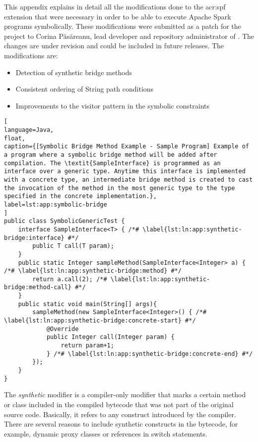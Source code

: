 \label{app:collaborations}

This appendix explains in detail all the modifications done to the \acrfull{acr:spf} extension that were necessary in order to be able to execute Apache Spark programs symbolically. These modifications were submitted as a patch for the \spf{} project to Corina Păsăreanu, lead developer and repository administrator of \spf{}. The changes are under revision and could be included in future releases. The modifications are:

\begin{itemize}
	\item Detection of synthetic bridge methods
	\item Consistent ordering of String path conditions
	\item Improvements to the visitor pattern in the symbolic constraints
\end{itemize}


\begin{lstlisting}[
language=Java,
float,
caption={[Symbolic Bridge Method Example - Sample Program] Example of a program where a symbolic bridge method will be added after compilation. The \textit{SampleInterface} is programmed as an interface over a generic type. Anytime this interface is implemented with a concrete type, an intermediate bridge method is created to cast the invocation of the method in the most generic type to the type specified in the concrete implementation.},
label=lst:app:symbolic-bridge
]
public class SymbolicGenericTest {
	interface SampleInterface<T> { /*# \label{lst:ln:app:synthetic-bridge:interface} #*/
		public T call(T param); 
	}
	public static Integer sampleMethod(SampleInterface<Integer> a) { /*# \label{lst:ln:app:synthetic-bridge:method} #*/
		return a.call(2); /*# \label{lst:ln:app:synthetic-bridge:method-call} #*/
	}
	public static void main(String[] args){
		sampleMethod(new SampleInterface<Integer>() { /*# \label{lst:ln:app:synthetic-bridge:concrete-start} #*/
			@Override
			public Integer call(Integer param) {				
				return param+1;
			} /*# \label{lst:ln:app:synthetic-bridge:concrete-end} #*/
		});
	}
}
\end{lstlisting}

The \textit{synthetic} modifier is a compiler-only modifier that marks a certain method or class included in the compiled bytecode that was not part of the original source code. Basically, it refers to any construct introduced by the compiler. There are several reasons to include synthetic constructs in the bytecode, for example, dynamic proxy classes or references in switch statements.

